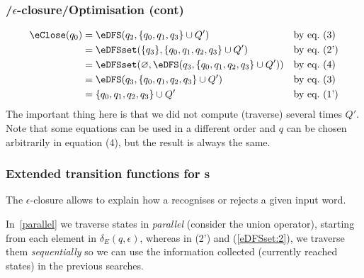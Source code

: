 % 
\begin{frame}
\frametitle{\eNFA{}/\(\epsilon\)-closure/Optimisation (cont)}

\begin{align*}
   \eClose (q_0) 
&= \eDFS (q_2, \{q_0, q_1, q_3\} \cup Q')
&& \text{by eq.~(3)}\\
&= \eDFSset (\{q_3\}, \{q_0, q_1, q_2, q_3\} \cup Q')
&& \text{by eq.~(2')}\\
&= \eDFSset (\varnothing, \eDFS (q_3, \{q_0, q_1, q_2, q_3\} \cup Q'))
&& \text{by eq.~(4)}\\
&= \eDFS (q_3, \{q_0, q_1, q_2, q_3\} \cup Q')
&& \text{by eq.~(3)}\\
&= \{q_0, q_1, q_2, q_3\} \cup Q'
&& \text{by eq.~(1')}\\
\end{align*}
The important thing here is that we did not compute (traverse) several
times \(Q'\). Note that some equations can be used in a different
order and \(q\) can be chosen arbitrarily in equation (4), but the
result is always the same.

\end{frame}

% 
\begin{frame}
\frametitle{Extended transition functions for {\eNFA}s}

The \(\epsilon\)-closure allows to explain how a \eNFA recognises or
rejects a given input word.
\bigskip

In~\eqref{parallel} we traverse states in \emph{parallel} (consider
the union operator), starting from each element in \(\delta_E (q,
\epsilon)\), whereas in (2') and (\ref{eDFSset:2}), we traverse them
\emph{sequentially} so we can use the information collected (currently
reached states) in the previous searches.

\end{frame}

